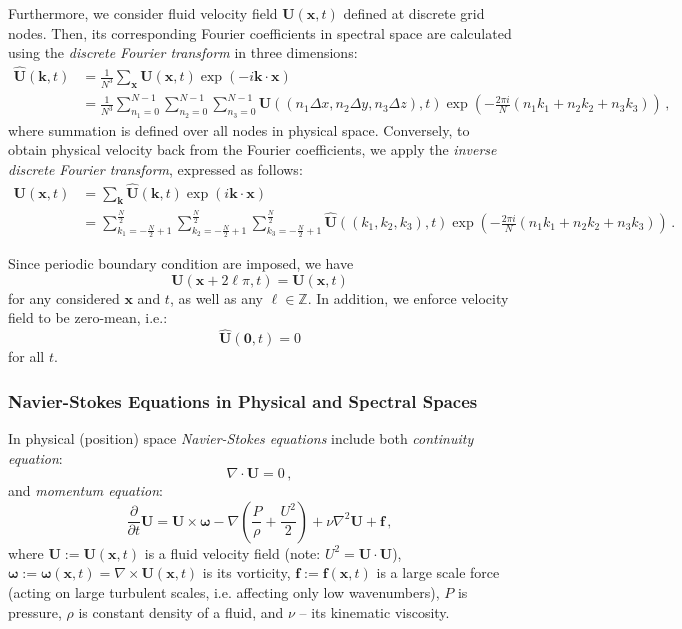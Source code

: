 \documentclass{pracamgren}
\begin{document}
Furthermore, we consider fluid velocity field $\mathbf{U}(\mathbf{x}, t)$ defined at discrete grid nodes.
Then, its corresponding Fourier coefficients in spectral space are calculated using the \emph{discrete Fourier transform} in three dimensions:
\begin{align*}
\mathbf{\hat{U}}(\mathbf{k}, t) &= \frac{1}{N^3} \sum_{\mathbf{x}} \mathbf{U}(\mathbf{x}, t) \exp(-i \mathbf{k} \cdot \mathbf{x}) \\
                                &= \frac{1}{N^3} \sum_{n_1 = 0}^{N-1} \sum_{n_2 = 0}^{N-1} \sum_{n_3 = 0}^{N-1} \mathbf{U} ((n_1 \Delta x, n_2 \Delta y, n_3 \Delta z), t) \exp(- \frac{2 \pi i}{N}(n_1 k_1 + n_2 k_2 + n_3 k_3)) \, ,
\end{align*}
where summation is defined over all nodes in physical space.
Conversely, to obtain physical velocity back from the Fourier coefficients, we apply the \emph{inverse discrete Fourier transform}, expressed as follows:
\begin{align*}
\mathbf{U}(\mathbf{x}, t) &= \sum_{\mathbf{k}} \mathbf{\hat{U}} (\mathbf{k}, t) \exp(i \mathbf{k} \cdot \mathbf{x}) \\
                          &= \sum_{k_1 = - \frac{N}{2} + 1}^{\frac{N}{2}} \sum_{k_2 = - \frac{N}{2} + 1}^{\frac{N}{2}} \sum_{k_3 = - \frac{N}{2} + 1}^{\frac{N}{2}} \mathbf{\hat{U}}((k_1, k_2, k_3), t) \exp \left( - \frac{2 \pi i}{N}(n_1 k_1 + n_2 k_2 + n_3 k_3) \right) \, .
\end{align*}

Since periodic boundary condition are imposed, we have
$$ \mathbf{U}(\mathbf{x} + 2 \ell \pi, t) = \mathbf{U}(\mathbf{x}, t)$$
for any considered $\mathbf{x}$ and $t$, as well as any $\ell \in \mathbb{Z}$.
In addition, we enforce velocity field to be zero-mean, i.e.:
$$ \mathbf{\hat{U}}(\mathbf{0}, t) = 0$$
for all $t$.

\subsubsection{Navier-Stokes Equations in Physical and Spectral Spaces}

In physical (position) space \emph{Navier-Stokes equations} include both \emph{continuity equation}:
\begin{equation}
\label{eqn:cont}
\nabla \cdot \mathbf{U} = 0 \, ,
\end{equation}
and \emph{momentum equation}:
\begin{equation}
\label{eqn:mom}
\frac{\partial}{\partial t} \mathbf{U} = \mathbf{U} \times \boldsymbol{\omega} - \nabla \left( \frac{P}{\rho} + \frac{U^2}{2} \right) + \nu \nabla^2 \mathbf{U} + \mathbf{f} \, ,
\end{equation}
where $\mathbf{U} := \mathbf{U}(\mathbf{x}, t)$ is a fluid velocity field (note: $U^2 = \mathbf{U} \cdot \mathbf{U}$), $ \boldsymbol{\omega} := \boldsymbol{\omega}(\mathbf{x}, t) = \nabla \times \mathbf{U}(\mathbf{x}, t) $ is its vorticity, $\mathbf{f} := \mathbf{f}(\mathbf{x}, t)$ is a large scale force (acting on large turbulent scales, i.e. affecting only low wavenumbers), $P$ is pressure, $\rho$ is constant density of a fluid, and $\nu$ -- its kinematic viscosity.
\end{document}
